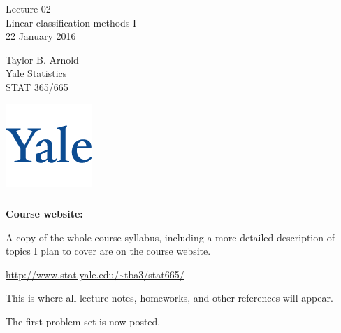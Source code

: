 \documentclass[xetex,mathserif,serif,aspectratio=169]{beamer}
\begin{document}
\begin{frame}[fragile] \frametitle{} \oldB \small

\vfill

{\fontsize{0.7cm}{0cm}\selectfont Lecture 02 \\\vspace{0.2cm} Linear classification methods I}\\\vspace{0.5cm}
22 January 2016

\vspace{2cm}

\begin{minipage}{0.6\textwidth}
Taylor B. Arnold \\
Yale Statistics \\
STAT 365/665
\end{minipage}
\hfill
\begin{minipage}{0.3\textwidth}\raggedleft
\includegraphics[scale=0.3]{../yale-logo.png}
\end{minipage}%

\end{frame}

\begin{frame}[fragile] \frametitle{} \oldB \small

\textbf{Course website:}

A copy of the whole course syllabus, including a more detailed description
of topics I plan to cover are on the course website.

\begin{center}
\url{http://www.stat.yale.edu/~tba3/stat665/}
\end{center}

This is where all lecture notes, homeworks, and other references will appear.

\pause The first problem set is now posted.

\end{frame}
\end{document}
